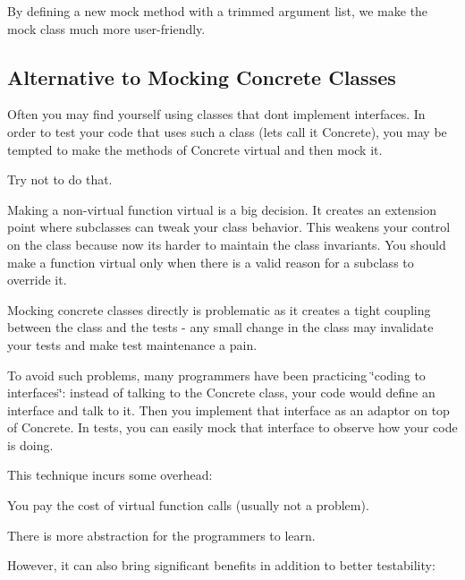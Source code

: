 By defining a new mock method with a trimmed argument list, we make the mock class much more user-\/friendly.

\subsection*{Alternative to Mocking Concrete Classes}

Often you may find yourself using classes that don\textquotesingle{}t implement interfaces. In order to test your code that uses such a class (let\textquotesingle{}s call it {\ttfamily Concrete}), you may be tempted to make the methods of {\ttfamily Concrete} virtual and then mock it.

Try not to do that.

Making a non-\/virtual function virtual is a big decision. It creates an extension point where subclasses can tweak your class\textquotesingle{} behavior. This weakens your control on the class because now it\textquotesingle{}s harder to maintain the class\textquotesingle{} invariants. You should make a function virtual only when there is a valid reason for a subclass to override it.

Mocking concrete classes directly is problematic as it creates a tight coupling between the class and the tests -\/ any small change in the class may invalidate your tests and make test maintenance a pain.

To avoid such problems, many programmers have been practicing \char`\"{}coding
to interfaces\char`\"{}\+: instead of talking to the {\ttfamily Concrete} class, your code would define an interface and talk to it. Then you implement that interface as an adaptor on top of {\ttfamily Concrete}. In tests, you can easily mock that interface to observe how your code is doing.

This technique incurs some overhead\+:


\begin{DoxyItemize}
\item You pay the cost of virtual function calls (usually not a problem).
\item There is more abstraction for the programmers to learn.
\end{DoxyItemize}

However, it can also bring significant benefits in addition to better testability\+:


